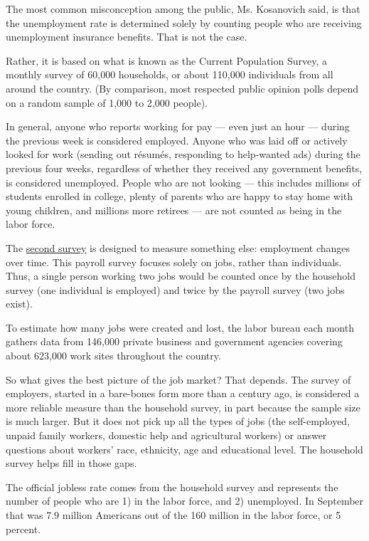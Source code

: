 The most common misconception among the public, Ms. Kosanovich said, is
that the unemployment rate is determined solely by counting people who
are receiving unemployment insurance benefits. That is not the case.

Rather, it is based on what is known as the Current Population Survey, a
monthly survey of 60,000 households, or about 110,000 individuals from
all around the country. (By comparison, most respected public opinion
polls depend on a random sample of 1,000 to 2,000 people).

In general, anyone who reports working for pay --- even just an hour ---
during the previous week is considered employed. Anyone who was laid off
or actively looked for work (sending out résumés, responding to
help-wanted ads) during the previous four weeks, regardless of whether
they received any government benefits, is considered unemployed. People
who are not looking --- this includes millions of students enrolled in
college, plenty of parents who are happy to stay home with young
children, and millions more retirees --- are not counted as being in the
labor force.

The \href{http://www.bls.gov/ces/}{second survey} is designed to measure
something else: employment changes over time. This payroll survey
focuses solely on jobs, rather than individuals. Thus, a single person
working two jobs would be counted once by the household survey (one
individual is employed) and twice by the payroll survey (two jobs
exist).

To estimate how many jobs were created and lost, the labor bureau each
month gathers data from 146,000 private business and government agencies
covering about 623,000 work sites throughout the country.

So what gives the best picture of the job market? That depends. The
survey of employers, started in a bare-bones form more than a century
ago, is considered a more reliable measure than the household survey, in
part because the sample size is much larger. But it does not pick up all
the types of jobs (the self-employed, unpaid family workers, domestic
help and agricultural workers) or answer questions about workers' race,
ethnicity, age and educational level. The household survey helps fill in
those gaps.

The official jobless rate comes from the household survey and represents
the number of people who are 1) in the labor force, and 2) unemployed.
In September that was 7.9 million Americans out of the 160 million in
the labor force, or 5 percent.

